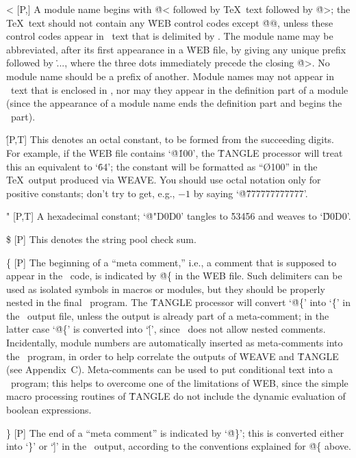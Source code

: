 \@< [P,\oT] A module name begins with \.{@<} followed by \TeX\ text followed
by \.{@>}; the \TeX\ text should not contain any \.{WEB} control codes
except \.{@@}, unless these control codes appear in \PASCAL\ text that
is delimited by \pb. The module name may be abbreviated, after its first
appearance in a \.{WEB} file, by giving any unique prefix followed by \.{...},
where the three dots immediately precede the closing \.{@>}. No module name
should be a prefix of another. Module names may not appear in \PASCAL\
text that is enclosed in \pb, nor may they appear in the definition part
of a module (since the appearance of a module name ends the definition
part and begins the \PASCAL\ part).

\@\' [P,T] This denotes an octal constant, to be formed from the
succeeding digits. For example, if the \.{WEB} file contains `\.{@\'100}',
the \.{TANGLE} processor will treat this an equivalent to `\.{64}';
the constant will be formatted as ``\O{100}'' in the \TeX\ output
produced via \.{WEAVE}. You should use octal notation only for positive
constants; don't try to get, e.g., $-1$ by saying `\.{@\'777777777777}'.

\@" [P,T] A hexadecimal constant; `\.{@"D0D0}' tangles to \.{53456} and
weaves to `\H{D0D0}'.

\@\$ [P] This denotes the string pool check sum.

\@\{ [P] The beginning of a ``meta comment,'' i.e., a comment
that is supposed to appear in the \PASCAL\ code, is indicated by
\.{@\{} in the \.{WEB} file. Such delimiters can be used as
isolated symbols in macros or modules, but they should be properly nested
in the final \PASCAL\ program. The \.{TANGLE} processor will convert
`\.{@\{}' into `\.\{' in the \PASCAL\ output file, unless
the output is already part of a meta-comment; in the latter case
`\.{@\{}' is converted into `\.[', since \PASCAL\ does not allow
nested comments. Incidentally, module numbers are automatically inserted
as meta-comments into the \PASCAL\ program, in order to help correlate the
outputs of \.{WEAVE} and \.{TANGLE} (see Appendix~C\null). Meta-comments
can be used to put conditional text into a \PASCAL\ program; this helps to
overcome one of the limitations of \.{WEB}, since the simple macro
processing routines of \.{TANGLE} do not include the dynamic evaluation of
boolean expressions.

\@\} [P] The end of a ``meta comment'' is indicated by `\.{@\}}'; this is
converted either into `\.\}' or `\.{]}' in the \PASCAL\ output, according
to the conventions explained for \.{@\{} above.

